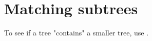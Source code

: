 \section{Matching subtrees}
\label{sct_match}

To see if a tree "contains" a smaller tree, use \match.
